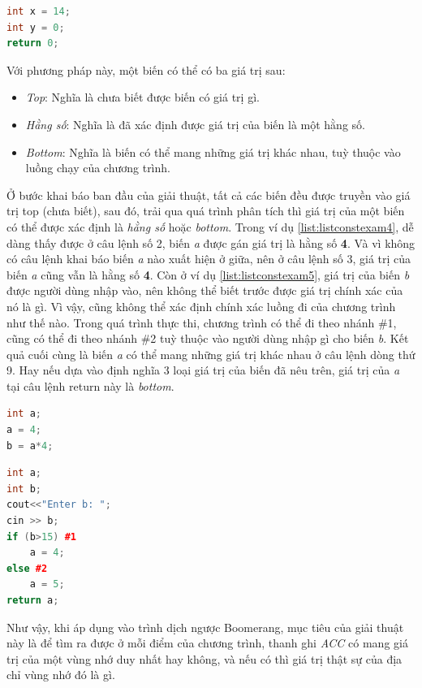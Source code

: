\begin{lstlisting}[caption={Đoạn mã sau khi thực hiện lan truyền hằng số cho biểu thức trả về},label={list:listconstexam3}, language=c++]
int x = 14;
int y = 0;
return 0;
\end{lstlisting}
Với phương pháp này, một biến có thể có ba giá trị sau:
\begin{itemize}
	\item \textit{Top}: Nghĩa là chưa biết được biến có giá trị gì.
	\item \textit{Hằng số}: Nghĩa là đã xác định được giá trị của biến là một hằng số.
	\item \textit{Bottom}: Nghĩa là biến có thể mang những giá trị khác nhau, tuỳ thuộc vào luồng chạy của chương trình.
\end{itemize}

Ở bước khai báo ban đầu của giải thuật, tất cả các biến đều được truyền vào giá trị top (chưa biết), sau đó, trải qua quá trình phân tích thì giá trị của một biến có thể được xác định là \textit{hằng số} hoặc \textit{bottom}. Trong ví dụ \ref{list:listconstexam4}, dễ dàng thấy được ở câu lệnh số 2, biến \textit{a} được gán giá trị là hằng số \textbf{4}. Và vì không có câu lệnh khai báo biến \textit{a} nào xuất hiện ở giữa, nên ở câu lệnh số 3, giá trị của biến \textit{a} cũng vẫn là hằng số \textbf{4}. Còn ở ví dụ \ref{list:listconstexam5}, giá trị của biến \textit{b} được người dùng nhập vào, nên không thể biết trước được giá trị chính xác của nó là gì. Vì vậy, cũng không thể xác định chính xác luồng đi của chương trình như thế nào. Trong quá trình thực thi, chương trình có thể đi theo nhánh \#1, cũng có thể đi theo nhánh \#2 tuỳ thuộc vào người dùng nhập gì cho biến \textit{b}. Kết quả cuối cùng là biến \textit{a} có thể mang những giá trị khác nhau ở câu lệnh dòng thứ 9. Hay nếu dựa vào định nghĩa 3 loại giá trị của biến đã nêu trên, giá trị của \textit{a} tại câu lệnh return này là \textit{bottom}.
\begin{lstlisting}[caption={Đoạn mã ví dụ biến có giá trị là hằng số},label={list:listconstexam4}, language=c++]
int a;
a = 4;
b = a*4;
\end{lstlisting}
\begin{lstlisting}[caption={Đoạn mã ví dụ biến có giá trị là bottom},label={list:listconstexam5}, language=c++]
int a;
int b;
cout<<"Enter b: ";
cin >> b;
if (b>15) #1
	a = 4;
else #2
	a = 5;
return a;
\end{lstlisting}

Như vậy, khi áp dụng vào trình dịch ngược Boomerang, mục tiêu của giải thuật này là để tìm ra được ở mỗi điểm của chương trình, thanh ghi \textit{ACC} có mang giá trị của một vùng nhớ duy nhất hay không, và nếu có thì giá trị thật sự của địa chỉ vùng nhớ đó là gì.

